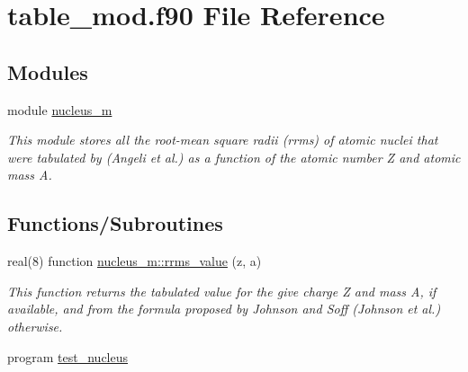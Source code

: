 \hypertarget{table__mod_8f90}{}\section{table\+\_\+mod.\+f90 File Reference}
\label{table__mod_8f90}
\subsection*{Modules}
\begin{DoxyCompactItemize}
\item 
module \mbox{\hyperlink{namespacenucleus__m}{nucleus\+\_\+m}}
\begin{DoxyCompactList}\small\item\em This module stores all the root-\/mean square radii (rrms) of atomic nuclei that were tabulated by (Angeli et al.) as a function of the atomic number Z and atomic mass A. \end{DoxyCompactList}\end{DoxyCompactItemize}
\subsection*{Functions/\+Subroutines}
\begin{DoxyCompactItemize}
\item 
real(8) function \mbox{\hyperlink{namespacenucleus__m_a83e8714be10756711874d134c66bcf73}{nucleus\+\_\+m\+::rrms\+\_\+value}} (z, a)
\begin{DoxyCompactList}\small\item\em This function returns the tabulated value for the give charge Z and mass A, if available, and from the formula proposed by Johnson and Soff (Johnson et al.) otherwise. \end{DoxyCompactList}\item 
program \mbox{\hyperlink{table__mod_8f90_a8ebb53a70bcfe3c94dbfbae3e3f52cba}{test\+\_\+nucleus}}
\end{DoxyCompactItemize}
